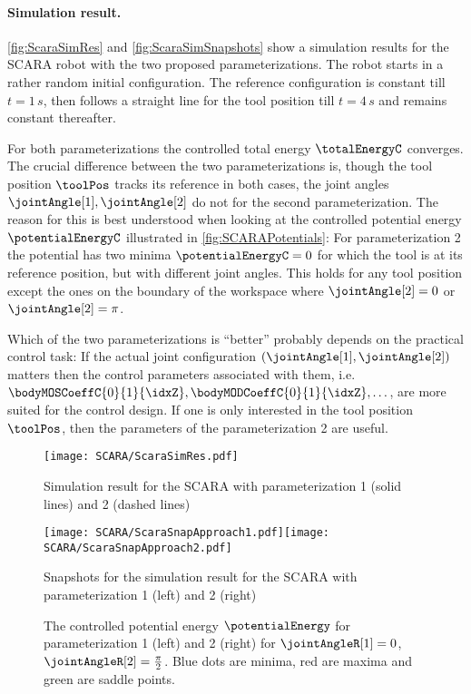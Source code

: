 \paragraph{Simulation result.}
\autoref{fig:ScaraSimRes} and \autoref{fig:ScaraSimSnapshots} show a simulation results for the SCARA robot with the two proposed parameterizations.
The robot starts in a rather random initial configuration.
The reference configuration is constant till $t=1\,\unit{s}$, then follows a straight line for the tool position till $t=4\,\unit{s}$ and remains constant thereafter.

For both parameterizations the controlled total energy $\totalEnergyC$ converges.
The crucial difference between the two parameterizations is, though the tool position $\toolPos$ tracks its reference in both cases, the joint angles $\jointAngle[1], \jointAngle[2]$ do not for the second parameterization.
The reason for this is best understood when looking at the controlled potential energy $\potentialEnergyC$ illustrated in \autoref{fig:SCARAPotentials}:
For parameterization 2 the potential has two minima $\potentialEnergyC=0$ for which the tool is at its reference position, but with different joint angles.
This holds for any tool position except the ones on the boundary of the workspace where $\jointAngle[2]=0$ or $\jointAngle[2]=\pi$.

Which of the two parameterizations is ``better'' probably depends on the practical control task:
If the actual joint configuration $(\jointAngle[1], \jointAngle[2])$ matters then the control parameters associated with them, i.e.\ $\bodyMOSCoeffC{0}{1}{\idxZ}, \bodyMODCoeffC{0}{1}{\idxZ}, \ldots$, are more suited for the control design.
If one is only interested in the tool position $\toolPos$, then the parameters of the parameterization 2 are useful.

\begin{figure}[htb]
 \centering
 \texttt{[image: SCARA/ScaraSimRes.pdf]}
 \caption{Simulation result for the SCARA with parameterization 1 (solid lines) and 2 (dashed lines)}
 \label{fig:ScaraSimRes}
\end{figure}

\begin{figure}[htb]
 \centering
 \texttt{[image: SCARA/ScaraSnapApproach1.pdf]}\texttt{[image: SCARA/ScaraSnapApproach2.pdf]}
 \caption{Snapshots for the simulation result for the SCARA with parameterization 1 (left) and 2 (right)}
 \label{fig:ScaraSimSnapshots}
\end{figure}

\begin{figure}[ht]
 \centering
 
 \caption{
 The controlled potential energy $\potentialEnergy$ for parameterization 1 (left) and 2 (right) for $\jointAngleR[1] = 0$, $\jointAngleR[2] = \tfrac{\pi}{2}$. %
 Blue dots are minima, red are maxima and green are saddle points.
 }
 \label{fig:SCARAPotentials}
\end{figure}


